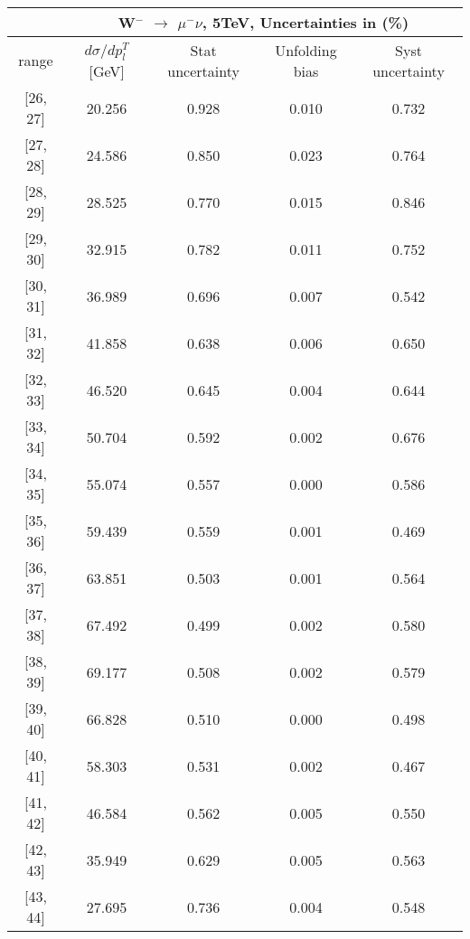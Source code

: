 \documentclass[12pt]{article}
\begin{document}
 
\begin{table}[] 
\begin{tabular}{c|c|c|c|c|}
\cline{2-5}
& \multicolumn{4}{c|}{W$^{-}$ $\rightarrow$ $\mu^{-} \nu $, 5TeV, Uncertainties in (\%)}  \\ \hline \hline 
\multicolumn{1}{|c|}{  range } & $d\sigma$/$dp^{T}_{l}$ [GeV]     & Stat uncertainty     & Unfolding bias     & Syst uncertainty        \\ \hline \hline 
\multicolumn{1}{|c|}{{[}26,  27{]}}  & 20.256 & 0.928 & 0.010 & 0.732 \\ \hline 
\multicolumn{1}{|c|}{{[}27,  28{]}}  & 24.586 & 0.850 & 0.023 & 0.764 \\ \hline 
\multicolumn{1}{|c|}{{[}28,  29{]}}  & 28.525 & 0.770 & 0.015 & 0.846 \\ \hline 
\multicolumn{1}{|c|}{{[}29,  30{]}}  & 32.915 & 0.782 & 0.011 & 0.752 \\ \hline 
\multicolumn{1}{|c|}{{[}30,  31{]}}  & 36.989 & 0.696 & 0.007 & 0.542 \\ \hline 
\multicolumn{1}{|c|}{{[}31,  32{]}}  & 41.858 & 0.638 & 0.006 & 0.650 \\ \hline 
\multicolumn{1}{|c|}{{[}32,  33{]}}  & 46.520 & 0.645 & 0.004 & 0.644 \\ \hline 
\multicolumn{1}{|c|}{{[}33,  34{]}}  & 50.704 & 0.592 & 0.002 & 0.676 \\ \hline 
\multicolumn{1}{|c|}{{[}34,  35{]}}  & 55.074 & 0.557 & 0.000 & 0.586 \\ \hline 
\multicolumn{1}{|c|}{{[}35,  36{]}}  & 59.439 & 0.559 & 0.001 & 0.469 \\ \hline 
\multicolumn{1}{|c|}{{[}36,  37{]}}  & 63.851 & 0.503 & 0.001 & 0.564 \\ \hline 
\multicolumn{1}{|c|}{{[}37,  38{]}}  & 67.492 & 0.499 & 0.002 & 0.580 \\ \hline 
\multicolumn{1}{|c|}{{[}38,  39{]}}  & 69.177 & 0.508 & 0.002 & 0.579 \\ \hline 
\multicolumn{1}{|c|}{{[}39,  40{]}}  & 66.828 & 0.510 & 0.000 & 0.498 \\ \hline 
\multicolumn{1}{|c|}{{[}40,  41{]}}  & 58.303 & 0.531 & 0.002 & 0.467 \\ \hline 
\multicolumn{1}{|c|}{{[}41,  42{]}}  & 46.584 & 0.562 & 0.005 & 0.550 \\ \hline 
\multicolumn{1}{|c|}{{[}42,  43{]}}  & 35.949 & 0.629 & 0.005 & 0.563 \\ \hline 
\multicolumn{1}{|c|}{{[}43,  44{]}}  & 27.695 & 0.736 & 0.004 & 0.548 \\ \hline 

\end{tabular}
\end{table}
\end{document}
